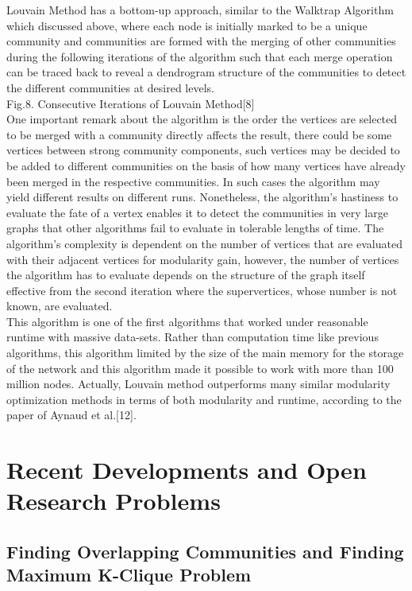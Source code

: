 \documentclass[10pt]{article}
\begin{document}
Louvain Method has a bottom-up approach, similar to the Walktrap Algorithm which discussed above, where each node is initially marked to be a unique community and communities are formed with the merging of other communities during the following iterations of the algorithm such that each merge operation can be traced back to reveal a dendrogram structure of the communities to detect the different communities at desired levels. \\

Fig.8. Consecutive Iterations of Louvain Method[8] \\

One important remark about the algorithm is the order the vertices are selected to be merged with a community directly affects the result, there could be some vertices between strong community components, such vertices may be decided to be added to different communities on the basis of how many vertices have already been merged in the respective communities. In such cases the algorithm may yield different results on different runs.
Nonetheless, the algorithm’s hastiness to evaluate the fate of a vertex enables it to detect the communities in very large graphs that other algorithms fail to evaluate in tolerable lengths of time. The algorithm’s complexity is dependent on the number of vertices that are evaluated with their adjacent vertices for modularity gain, however, the number of vertices the algorithm has to evaluate depends on the structure of the graph itself effective from the second iteration where the supervertices, whose number is not known, are evaluated. \\

This algorithm is one of the first algorithms that worked under reasonable runtime with massive data-sets. Rather than computation time like previous algorithms, this algorithm limited by the size of the main memory for the storage of the network and this algorithm made it possible to work with more than 100 million nodes. Actually, Louvain method outperforms many similar modularity optimization methods in terms of both modularity and runtime, according to the paper of Aynaud et al.[12]. \\

\section{Recent Developments and Open Research Problems} 

\subsection{Finding Overlapping Communities and Finding Maximum K-Clique Problem}
\end{document}
